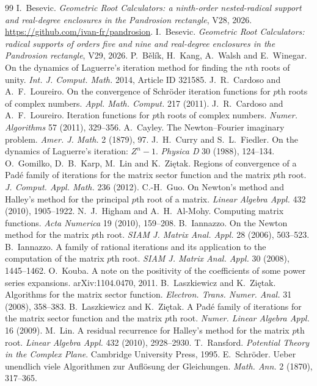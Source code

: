\documentclass[10pt,a4paper]{article}
\theoremstyle{plain}
\theoremstyle{remark}
\numberwithin{equation}{section}
\begin{document}
\begin{thebibliography}{99}\small
{} I.~Besevic. \emph{Geometric Root Calculators: a ninth-order nested-radical support and
real-degree enclosures in the Pandrosion rectangle}, V28, 2026.
\url{https://github.com/ivan-fr/pandrosion}.
 I.~Besevic. \emph{Geometric Root Calculators: radical supports of orders five and nine
and real-degree enclosures in the Pandrosion rectangle}, V29, 2026.
 P.~B\v{e}l\'ik, H.~Kang, A.~Walsh and E.~Winegar. On the dynamics of Laguerre's
iteration method for finding the $n$th roots of unity. \emph{Int. J. Comput. Math.} 2014, Article
ID 321585.
 J.~R.~Cardoso and A.~F.~Loureiro. On the convergence of Schr\"oder iteration
functions for $p$th roots of complex numbers. \emph{Appl. Math. Comput.} 217 (2011).
 J.~R.~Cardoso and A.~F.~Loureiro. Iteration functions for $p$th roots of complex
numbers. \emph{Numer. Algorithms} 57 (2011), 329--356.
 A.~Cayley. The Newton--Fourier imaginary problem. \emph{Amer. J. Math.} 2 (1879), 97.
 J.~H.~Curry and S.~L.~Fiedler. On the dynamics of Laguerre's iteration: $Z^{n}-1$.
\emph{Physica D} 30 (1988), 124--134.
 O.~Gomilko, D.~B.~Karp, M.~Lin and K.~Zi\k{e}tak. Regions of convergence of a
Pad\'e family of iterations for the matrix sector function and the matrix $p$th root.
\emph{J. Comput. Appl. Math.} 236 (2012).
 C.-H.~Guo. On Newton's method and Halley's method for the principal $p$th root of a
matrix. \emph{Linear Algebra Appl.} 432 (2010), 1905--1922.
 N.~J.~Higham and A.~H.~Al-Mohy. Computing matrix functions. \emph{Acta Numerica}
19 (2010), 159--208.
 B.~Iannazzo. On the Newton method for the matrix $p$th root. \emph{SIAM J.
Matrix Anal. Appl.} 28 (2006), 503--523.
 B.~Iannazzo. A family of rational iterations and its application to the
computation of the matrix $p$th root. \emph{SIAM J. Matrix Anal. Appl.} 30 (2008), 1445--1462.
 O.~Kouba. A note on the positivity of the coefficients of some power series
expansions. arXiv:1104.0470, 2011.
 B.~Laszkiewicz and K.~Zi\k{e}tak. Algorithms for the matrix sector function.
\emph{Electron. Trans. Numer. Anal.} 31 (2008), 358--383.
 B.~Laszkiewicz and K.~Zi\k{e}tak. A Pad\'e family of iterations for the matrix sector
function and the matrix $p$th root. \emph{Numer. Linear Algebra Appl.} 16 (2009).
 M.~Lin. A residual recurrence for Halley's method for the matrix $p$th root.
\emph{Linear Algebra Appl.} 432 (2010), 2928--2930.
 T.~Ransford. \emph{Potential Theory in the Complex Plane}. Cambridge University
Press, 1995.
 E.~Schr\"oder. Ueber unendlich viele Algorithmen zur Aufl\"osung der Gleichungen.
\emph{Math. Ann.} 2 (1870), 317--365.
\end{thebibliography}
\end{document}
